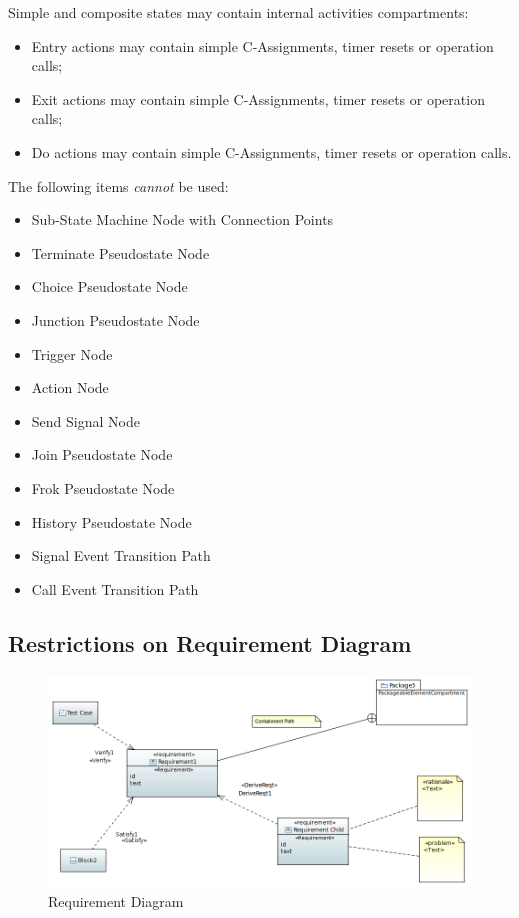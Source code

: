 Simple and composite states may contain internal activities
compartments:
\begin{itemize}
\item Entry actions may contain simple C-Assignments, timer resets or
  operation calls;
\item Exit actions may contain simple C-Assignments, timer resets or
  operation calls;
\item Do actions may contain simple C-Assignments, timer resets or
  operation calls.
\end{itemize}

The following items \emph{cannot} be used:
\begin{itemize}
\item Sub-State Machine Node with Connection Points
\item Terminate Pseudostate Node
\item Choice Pseudostate Node
\item Junction Pseudostate Node
\item Trigger Node
\item Action Node
\item Send Signal Node
\item Join Pseudostate Node
\item Frok Pseudostate Node
\item History Pseudostate Node
\item Signal Event Transition Path
\item Call Event Transition Path
\end{itemize}

\subsection{Restrictions on Requirement Diagram}

\begin{figure}[ht]
  \centering
  \includegraphics[width=\textwidth]{images/RequirementDiagram.PNG}
  \caption{Requirement Diagram}
  \label{fig:req diagram}
\end{figure}


